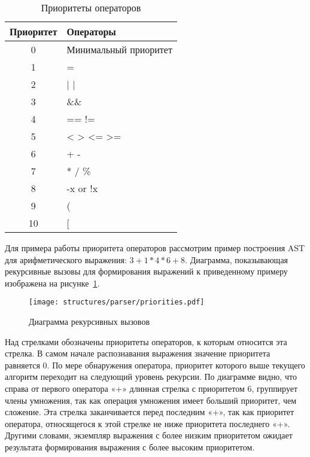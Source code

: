 \begin{table}[h!]
    \Large
    \caption{Приоритеты операторов}
    \label{t:operator_priority}
    \centering
    \begin{tabularx}{\textwidth}{|c|X|}
        \hline
        Приоритет & Операторы             \\
        \hline
        0         & Минимальный приоритет \\
        \hline
        1         & =                     \\
        \hline
        2         & | |                   \\
        \hline
        3         & \&\&                  \\
        \hline
        4         & == !=                 \\
        \hline
        5         & < > <= >=             \\
        \hline
        6         & + -                   \\
        \hline
        7         & * / \%                \\
        \hline
        8         & -x or !x              \\
        \hline
        9         & (                     \\
        \hline
        10        & [                     \\
        \hline
    \end{tabularx}
    \vspace{\bottompaddingoftable}
\end{table}

Для примера работы приоритета операторов рассмотрим пример построения AST для арифметического выражения: $3 + 1 * 4 * 6 + 8$.
Диаграмма, показывающая рекурсивные вызовы для формирования выражений к приведенному примеру изображена на рисунке~\ref{f:priorities}.

\begin{figure}[ht]
	\centering
	\vspace{\toppaddingoffigure}
	\texttt{[image: structures/parser/priorities.pdf]}
	\caption{Диаграмма рекурсивных вызовов}
	\label{f:priorities}
\end{figure}

Над стрелками обозначены приоритеты операторов, к которым относится эта стрелка.
В самом начале распознавания выражения значение приоритета равняется 0.
По мере обнаружения оператора, приоритет которого выше текущего алгоритм переходит на следующий уровень рекурсии.
По диаграмме видно, что справа от первого оператора «+» длинная стрелка с приоритетом 6, группирует члены умножения, так как операция умножения имеет больший приоритет, чем сложение.
Эта стрелка заканчивается перед последним «+», так как приоритет оператора, относящегося к этой стрелке не ниже приоритета последнего «+».
Другими словами, экземпляр выражения с более низким приоритетом ожидает результата формирования выражения с более высоким приоритетом.

